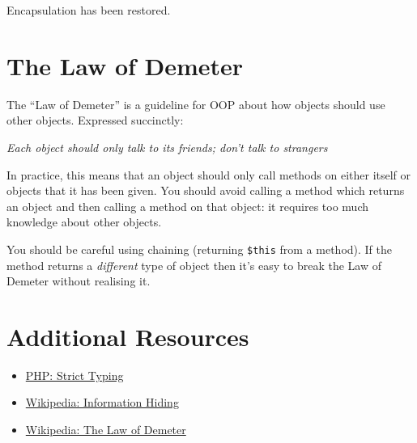 Encapsulation has been restored.


\section{The Law of Demeter}

The ``Law of Demeter'' is a guideline for OOP about how objects should use other objects. Expressed succinctly:

\begin{center}
    \textit{Each object should only talk to its friends; don't talk to strangers}
\end{center}

In practice, this means that an object should only call methods on either itself or objects that it has been given. You should avoid calling a method which returns an object and then calling a method on that object: it requires too much knowledge about other objects.


You should be careful using chaining (returning \texttt{\$this} from a method). If the method returns a \textit{different} type of object then it's easy to break the Law of Demeter without realising it.


\section{Additional Resources}

\begin{itemize}[leftmargin=*]
    \item \href{http://www.php.net/manual/en/functions.arguments.php#functions.arguments.type-declaration.strict}{PHP: Strict Typing}
    \item \href{https://en.wikipedia.org/wiki/Information_hiding}{Wikipedia: Information Hiding}
    \item \href{https://en.wikipedia.org/wiki/Law_of_Demeter}{Wikipedia: The Law of Demeter}
\end{itemize}
